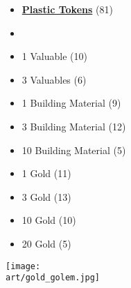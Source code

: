\begin{multicols*}{2}
\begin{itemize}[leftmargin=0pt, label={}, noitemsep]
  \item \textbf{\small{\underline{Plastic Tokens}}} (81)
  \item
  \item 1 Valuable (10)
  \item 3 Valuables (6)
  \item 1 Building Material (9)
  \item 3 Building Material (12)
  \item 10 Building Material (5)
  \item 1 Gold (11)
  \item 3 Gold (13)
  \item 10 Gold (10)
  \item 20 Gold (5)
\end{itemize}

\columnbreak

\hspace{-2.75em}
\texttt{[image: \\art/gold\_golem.jpg]}

\end{multicols*}
